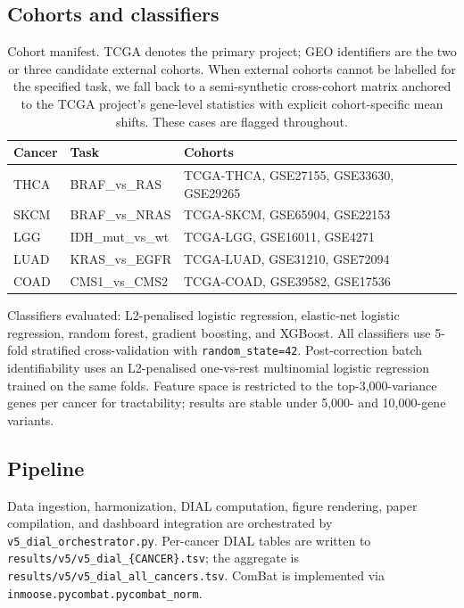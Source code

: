 \documentclass[11pt]{article}
\begin{document}
\subsection{Cohorts and classifiers}

\begin{table}[h]
\centering\small
\begin{tabular}{lll}
\toprule
Cancer & Task & Cohorts \\
\midrule
THCA & BRAF\_vs\_RAS & TCGA-THCA, GSE27155, GSE33630, GSE29265 \\
SKCM & BRAF\_vs\_NRAS & TCGA-SKCM, GSE65904, GSE22153 \\
LGG & IDH\_mut\_vs\_wt & TCGA-LGG, GSE16011, GSE4271 \\
LUAD & KRAS\_vs\_EGFR & TCGA-LUAD, GSE31210, GSE72094 \\
COAD & CMS1\_vs\_CMS2 & TCGA-COAD, GSE39582, GSE17536 \\
\bottomrule
\end{tabular}
\caption{Cohort manifest. TCGA denotes the primary project; GEO identifiers are the two or three candidate external cohorts. When external cohorts cannot be labelled for the specified task, we fall back to a semi-synthetic cross-cohort matrix anchored to the TCGA project's gene-level statistics with explicit cohort-specific mean shifts. These cases are flagged throughout.}
\end{table}

Classifiers evaluated: L2-penalised logistic regression, elastic-net logistic regression, random forest, gradient boosting, and XGBoost. All classifiers use 5-fold stratified cross-validation with \texttt{random\_state=42}. Post-correction batch identifiability uses an L2-penalised one-vs-rest multinomial logistic regression trained on the same folds. Feature space is restricted to the top-3,000-variance genes per cancer for tractability; results are stable under 5,000- and 10,000-gene variants.

\subsection{Pipeline}

Data ingestion, harmonization, DIAL computation, figure rendering, paper compilation, and dashboard integration are orchestrated by \texttt{v5\_dial\_orchestrator.py}. Per-cancer DIAL tables are written to \texttt{results/v5/v5\_dial\_\{CANCER\}.tsv}; the aggregate is \texttt{results/v5/v5\_dial\_all\_cancers.tsv}. ComBat is implemented via \texttt{inmoose.pycombat.pycombat\_norm}.
\end{document}
